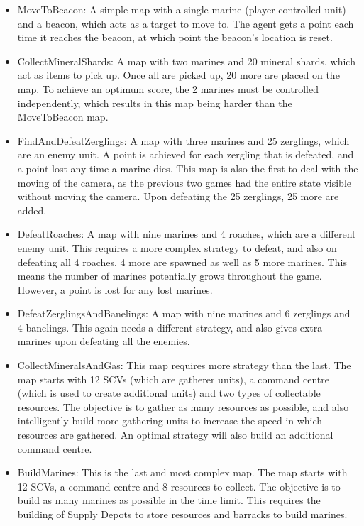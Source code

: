 \begin{itemize}
    \item MoveToBeacon: A simple map with a single marine (player controlled
        unit) and a beacon, which acts as a target to move to. The agent gets
        a point each time it reaches the beacon, at which point the beacon's
        location is reset.
    \item CollectMineralShards: A map with two marines and 20 mineral shards,
        which act as items to pick up. Once all are picked up, 20 more are
        placed on the map. To achieve an optimum score, the 2 marines must
        be controlled independently, which results in this map being
        harder than the MoveToBeacon map.
    \item FindAndDefeatZerglings: A map with three marines and 25 zerglings,
        which are an enemy unit. A point is achieved for each zergling that
        is defeated, and a point lost any time a marine dies. This map
        is also the first to deal with the moving of the camera, as the previous
        two games had the entire state visible without moving the camera.
        Upon defeating the 25 zerglings, 25 more are added.
    \item DefeatRoaches: A map with nine marines and 4 roaches, which are a
        different enemy unit. This requires a more complex strategy to defeat,
        and also on defeating all 4 roaches, 4 more are spawned as well as 5
        more marines. This means the number of marines potentially grows
        throughout the game. However, a point is lost for any lost marines.
    \item DefeatZerglingsAndBanelings: A map with nine marines and 6 zerglings
        and 4 banelings. This again needs a different strategy, and also gives
        extra marines upon defeating all the enemies.
    \item CollectMineralsAndGas: This map requires more strategy than the last.
        The map starts with 12 SCVs (which are gatherer units), a command centre
        (which is used to create additional units) and two types of collectable
        resources. The objective is to gather as many resources as possible, and
        also intelligently build more gathering units to increase the
        speed in which resources are gathered. An optimal strategy will also
        build an additional command centre.
    \item BuildMarines: This is the last and most complex map. The map starts
        with 12 SCVs, a command centre and 8 resources to collect. The
        objective is to build as many marines as possible in the time limit.
        This requires the building of Supply Depots to store resources and
        barracks to build marines.
\end{itemize}

